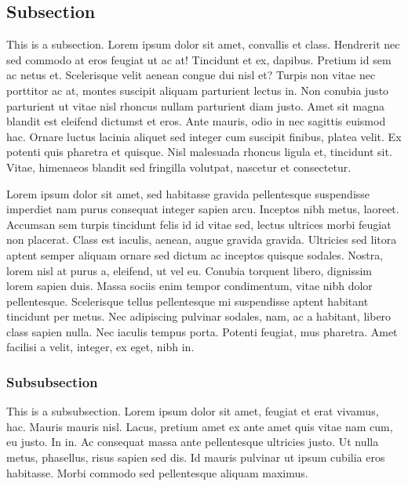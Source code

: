 \documentclass{article}
\begin{document}
\hypertarget{subsection}{%
\subsection{Subsection}\label{subsection}}

This is a subsection. Lorem ipsum dolor sit amet, convallis et class. Hendrerit nec sed commodo at eros feugiat ut ac at! Tincidunt et ex, dapibus. Pretium id sem ac netus et. Scelerisque velit aenean congue dui nisl et? Turpis non vitae nec porttitor ac at, montes suscipit aliquam parturient lectus in. Non conubia justo parturient ut vitae nisl rhoncus nullam parturient diam justo. Amet sit magna blandit est eleifend dictumst et eros. Ante mauris, odio in nec sagittis euismod hac. Ornare luctus lacinia aliquet sed integer cum suscipit finibus, platea velit. Ex potenti quis pharetra et quisque. Nisl malesuada rhoncus ligula et, tincidunt sit. Vitae, himenaeos blandit sed fringilla volutpat, nascetur et consectetur.

Lorem ipsum dolor sit amet, sed habitasse gravida pellentesque suspendisse imperdiet nam purus consequat integer sapien arcu. Inceptos nibh metus, laoreet. Accumsan sem turpis tincidunt felis id id vitae sed, lectus ultrices morbi feugiat non placerat. Class est iaculis, aenean, augue gravida gravida. Ultricies sed litora aptent semper aliquam ornare sed dictum ac inceptos quisque sodales. Nostra, lorem nisl at purus a, eleifend, ut vel eu. Conubia torquent libero, dignissim lorem sapien duis. Massa sociis enim tempor condimentum, vitae nibh dolor pellentesque. Scelerisque tellus pellentesque mi suspendisse aptent habitant tincidunt per metus. Nec adipiscing pulvinar sodales, nam, ac a habitant, libero class sapien nulla. Nec iaculis tempus porta. Potenti feugiat, mus pharetra. Amet facilisi a velit, integer, ex eget, nibh in.

\hypertarget{subsubsection}{%
\subsubsection{Subsubsection}\label{subsubsection}}

This is a subsubsection. Lorem ipsum dolor sit amet, feugiat et erat vivamus, hac. Mauris mauris nisl. Lacus, pretium amet ex ante amet quis vitae nam cum, eu justo. In in. Ac consequat massa ante pellentesque ultricies justo. Ut nulla metus, phasellus, risus sapien sed dis. Id mauris pulvinar ut ipsum cubilia eros habitasse. Morbi commodo sed pellentesque aliquam maximus.
\end{document}
